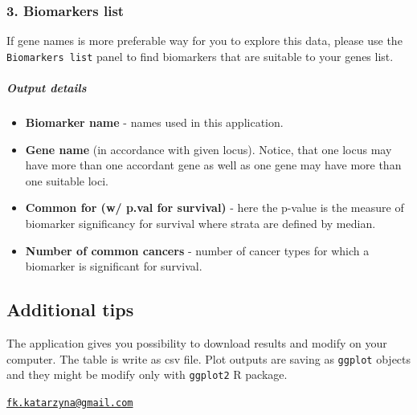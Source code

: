 \subsubsection{3. Biomarkers list}\label{biomarkers-list}

If gene names is more preferable way for you to explore this data,
please use the \texttt{Biomarkers list} panel to find biomarkers that
are suitable to your genes list.

\subparagraph{Output details}\label{output-details-2}

\begin{itemize}
\itemsep1pt\parskip0pt
\item
  \textbf{Biomarker name} - names used in this application.
\item
  \textbf{Gene name} (in accordance with given locus). Notice, that one
  locus may have more than one accordant gene as well as one gene may
  have more than one suitable loci.
\item
  \textbf{Common for (w/ p.val for survival)} - here the p-value is the
  measure of biomarker significancy for survival where strata are
  defined by median.
\item
  \textbf{Number of common cancers} - number of cancer types for which a
  biomarker is significant for survival.
\end{itemize}

\subsection{Additional tips}\label{additional-tips}

The application gives you possibility to download results and modify on
your computer. The table is write as csv file. Plot outputs are saving
as \texttt{ggplot} objects and they might be modify only with
\texttt{ggplot2} R package.



\address{%
Katarzyna Sobiczewska\\
\\
\\
}
\href{mailto:fk.katarzyna@gmail.com}{\nolinkurl{fk.katarzyna@gmail.com}}

